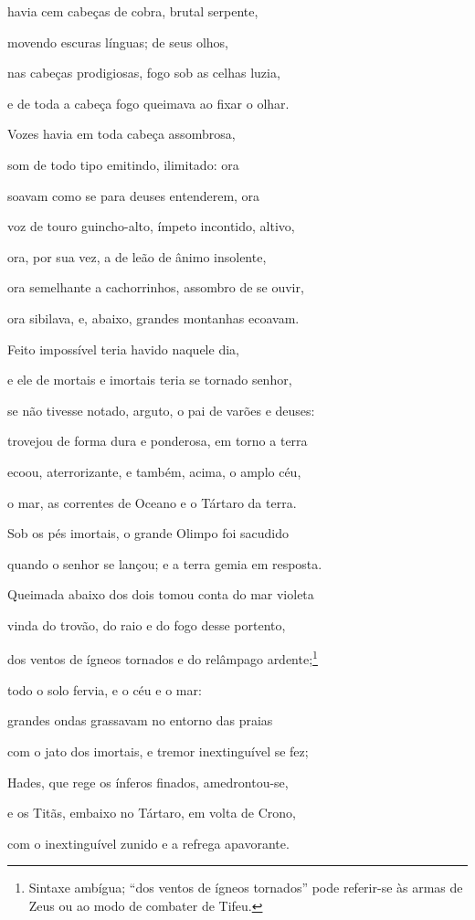 \begin{pages}
\begin{Rightside}
havia cem cabeças de cobra, brutal serpente, 

movendo escuras línguas; de seus olhos,

nas cabeças prodigiosas, fogo sob as celhas luzia,

e de toda a cabeça fogo queimava ao fixar o olhar.

Vozes havia em toda cabeça assombrosa,

som de todo tipo emitindo, ilimitado: ora 

soavam como se para deuses entenderem, ora

voz de touro guincho-alto, ímpeto incontido, altivo,

ora, por sua vez, a de leão de ânimo insolente,

ora semelhante a cachorrinhos, assombro de se ouvir,

ora sibilava, e, abaixo, grandes montanhas ecoavam. 

Feito impossível teria havido naquele dia,

e ele de mortais e imortais teria se tornado senhor,

se não tivesse notado, arguto, o pai de varões e deuses:

trovejou de forma dura e ponderosa, em torno a terra

ecoou, aterrorizante, e também, acima, o amplo céu, 

o mar, as correntes de Oceano e o Tártaro da terra.

Sob os pés imortais, o grande Olimpo foi sacudido

quando o senhor se lançou; e a terra gemia em resposta.

Queimada abaixo dos dois tomou conta do mar violeta

vinda do trovão, do raio e do fogo desse portento, 

dos ventos de ígneos tornados e do relâmpago ardente;\footnote{Sintaxe ambígua; ``dos ventos de ígneos tornados'' pode referir-se às armas de Zeus ou ao modo de combater de Tifeu.}

todo o solo fervia, e o céu e o mar:

grandes ondas grassavam no entorno das praias

com o jato dos imortais, e tremor inextinguível se fez;

Hades, que rege os ínferos finados, amedrontou-se, 

e os Titãs, embaixo no Tártaro, em volta de Crono,

com o inextinguível zunido e a refrega apavorante.


\end{Rightside}
\end{pages}

